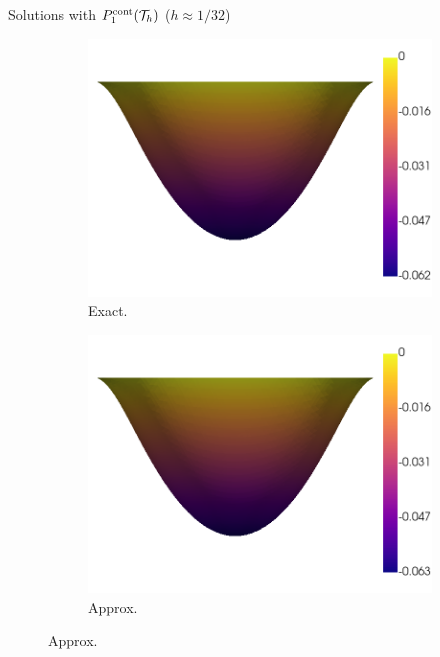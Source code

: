	\begin{frame}{Solutions with $\relax{P}^{\text{cont}}_1(\mathcal{T}_h)$ ($h\approx 1/32$)}
		\begin{figure}[h!]
			\begin{subfigure}{0.49\textwidth}
				\centering
				\includegraphics[scale=0.2]{img/Difusion/diff_u_ex_nx-32.png}
				\caption{Exact.}
			\end{subfigure}
			\begin{subfigure}{0.49\textwidth}
				\centering
				\includegraphics[scale=0.2]{img/Difusion/diff_u_FE_nx-32.png}
				\caption{Approx.}
			\end{subfigure}
		\end{figure}
	\end{frame}

